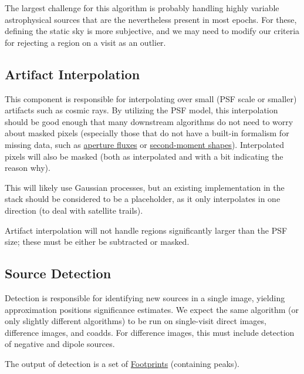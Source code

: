 The largest challenge for this algorithm is probably handling highly variable astrophysical sources that are the nevertheless present in most epochs.  For these, defining the static sky is more subjective, and we may need to modify our criteria for rejecting a region on a visit as an outlier.


\subsection{Artifact Interpolation}
\label{sec:acArtifactInterpolation}

This component is responsible for interpolating over small (PSF scale or smaller) artifacts such as cosmic rays.  By utilizing the PSF model, this interpolation should be good enough that many downstream algorithms do not need to worry about masked pixels (especially those that do not have a built-in formalism for missing data, such as \hyperref[sec:acAperturePhotometry]{aperture fluxes} or \hyperref[sec:acShapeAlgorithms]{second-moment shapes}).  Interpolated pixels will also be masked (both as interpolated and with a bit indicating the reason why).

This will likely use Gaussian processes, but an existing implementation in the stack should be considered to be a placeholder, as it only interpolates in one direction (to deal with satellite trails).

Artifact interpolation will not handle regions significantly larger than the PSF size; these must be either be subtracted or masked.


\subsection{Source Detection}
\label{sec:acSourceDetection}

Detection is responsible for identifying new sources in a single image, yielding approximation positions significance estimates.  We expect the same algorithm (or only slightly different algorithms) to be run on single-visit direct images, difference images, and coadds.  For difference images, this must include detection of negative and dipole sources.

The output of detection is a set of \hyperref[sec:spFootprints]{Footprints} (containing peaks).

